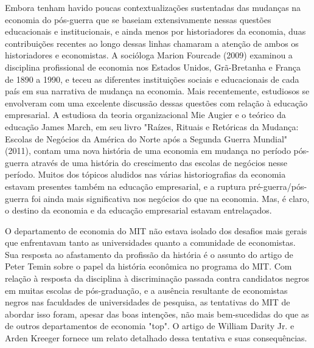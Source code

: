 \documentclass[a4paper,12pt]{article}[abntex2]
\begin{document}
Embora tenham havido poucas contextualizações sustentadas das mudanças na economia do pós-guerra que se baseiam extensivamente nessas questões educacionais e institucionais, e ainda menos por historiadores da economia, duas contribuições recentes ao longo dessas linhas chamaram a atenção de ambos os historiadores e economistas. A socióloga Marion Fourcade (2009) examinou a disciplina profissional de economia nos Estados Unidos, Grã-Bretanha e França de 1890 a 1990, e teceu as diferentes instituições sociais e educacionais de cada país em sua narrativa de mudança na economia. Mais recentemente, estudiosos se envolveram com uma excelente discussão dessas questões com relação à educação empresarial. A estudiosa da teoria organizacional Mie Augier e o teórico da educação James March, em seu livro "Raízes, Rituais e Retóricas da Mudança: Escolas de Negócios da América do Norte após a Segunda Guerra Mundial" (2011), contam uma nova história de uma economia em mudança no período pós-guerra através de uma história do crescimento das escolas de negócios nesse período. Muitos dos tópicos aludidos nas várias historiografias da economia estavam presentes também na educação empresarial, e a ruptura pré-guerra/pós-guerra foi ainda mais significativa nos negócios do que na economia. Mas, é claro, o destino da economia e da educação empresarial estavam entrelaçados.

O departamento de economia do MIT não estava isolado dos desafios mais gerais que enfrentavam tanto as universidades quanto a comunidade de economistas. Sua resposta ao afastamento da profissão da história é o assunto do artigo de Peter Temin sobre o papel da história econômica no programa do MIT. Com relação à resposta da disciplina à discriminação passada contra candidatos negros em muitas escolas de pós-graduação, e a ausência resultante de economistas negros nas faculdades de universidades de pesquisa, as tentativas do MIT de abordar isso foram, apesar das boas intenções, não mais bem-sucedidas do que as de outros departamentos de economia "top". O artigo de William Darity Jr. e Arden Kreeger fornece um relato detalhado dessa tentativa e suas consequências.
\end{document}
